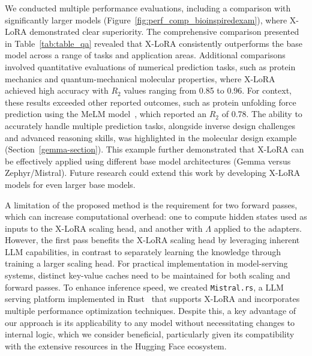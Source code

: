We conducted multiple performance evaluations, including a comparison with significantly larger models (Figure~\ref{fig:perf_comp_bioinspiredexam}), where X-LoRA demonstrated clear superiority. The comprehensive comparison presented in Table~\ref{tab:table_qa} revealed that X-LoRA consistently outperforms the base model across a range of tasks and application areas. Additional comparisons involved quantitative evaluations of numerical prediction tasks, such as protein mechanics and quantum-mechanical molecular properties, where X-LoRA achieved high accuracy with $R_2$ values ranging from 0.85 to 0.96. For context, these results exceeded other reported outcomes, such as protein unfolding force prediction using the MeLM model~\cite{Buehler2023MeLMProblemsb}, which reported an $R_2$ of 0.78. The ability to accurately handle multiple prediction tasks, alongside inverse design challenges and advanced reasoning skills, was highlighted in the molecular design example (Section~\ref{gemma-section}). This example further demonstrated that X-LoRA can be effectively applied using different base model architectures (Gemma versus Zephyr/Mistral). Future research could extend this work by developing X-LoRA models for even larger base models.

A limitation of the proposed method is the requirement for two forward passes, which can increase computational overhead: one to compute hidden states used as inputs to the X-LoRA scaling head, and another with $\Lambda$ applied to the adapters. However, the first pass benefits the X-LoRA scaling head by leveraging inherent LLM capabilities, in contrast to separately learning the knowledge through training a larger scaling head. For practical implementation in model-serving systems, distinct key-value caches need to be maintained for both scaling and forward passes. To enhance inference speed, we created \texttt{Mistral.rs}, a LLM serving platform implemented in Rust~\cite{matsakis2014rust} that supports X-LoRA and incorporates multiple performance optimization techniques. Despite this, a key advantage of our approach is its applicability to any model without necessitating changes to internal logic, which we consider beneficial, particularly given its compatibility with the extensive resources in the Hugging Face ecosystem.

